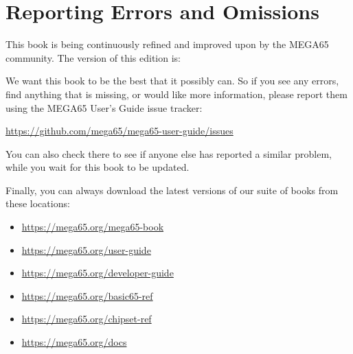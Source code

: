 \chapter*{Reporting Errors and Omissions}

This book is being continuously refined and improved upon by the MEGA65 community.
The version of this edition is:



We want this book to be the best that it possibly can. So if you see any errors,
find anything that is missing, or would like more information,
please report them using the MEGA65 User's Guide issue tracker:

\url{https://github.com/mega65/mega65-user-guide/issues}

You can also check there to see if anyone else has reported a similar problem,
while you wait for this book to be updated.

Finally, you can always download the latest versions of our suite of books from these locations:

\begin{itemize}
\item \url{https://mega65.org/mega65-book}
\item \url{https://mega65.org/user-guide}
\item \url{https://mega65.org/developer-guide}
\item \url{https://mega65.org/basic65-ref}
\item \url{https://mega65.org/chipset-ref}
\item \url{https://mega65.org/docs}
\end{itemize}
